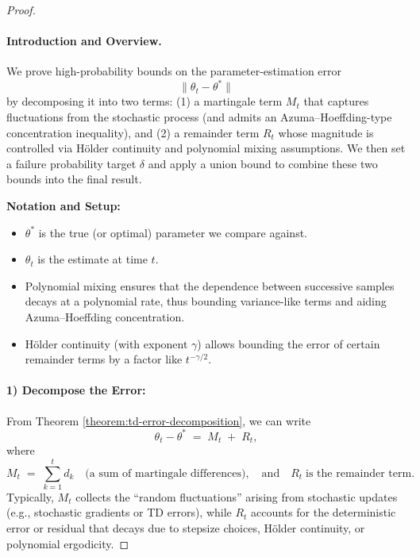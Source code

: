 \begin{proof}
\;\newline
\paragraph{Introduction and Overview.}
We prove high-probability bounds on the parameter-estimation error
\[
  \|\theta_t - \theta^*\|
\]
by decomposing it into two terms: (1) a martingale term $M_t$ that captures fluctuations from the stochastic process (and admits an Azuma--Hoeffding-type concentration inequality), and (2) a remainder term $R_t$ whose magnitude is controlled via H\"older continuity and polynomial mixing assumptions. We then set a failure probability target $\delta$ and apply a union bound to combine these two bounds into the final result.

\medskip
\noindent\newline
\textbf{Notation and Setup:}
\begin{itemize}
\item \(\theta^*\) is the true (or optimal) parameter we compare against.  
\item \(\theta_t\) is the estimate at time \(t\).  
\item Polynomial mixing ensures that the dependence between successive samples decays at a polynomial rate, thus bounding variance-like terms and aiding Azuma--Hoeffding concentration.  
\item H\"older continuity (with exponent \(\gamma\)) allows bounding the error of certain remainder terms by a factor like \(t^{-\gamma/2}\).  
\end{itemize}

\paragraph{1) Decompose the Error:}
From Theorem \ref{theorem:td-error-decomposition}, we can write
\[
  \theta_t - \theta^*
  \;=\;
  M_t \;+\; R_t,
\]
where
\[
  M_t
  \;=\;
  \sum_{k=1}^t d_k
  \quad
  \text{(a sum of martingale differences)}, 
  \quad
  \text{and}
  \quad
  R_t
  \;\text{is the remainder term.}
\]
Typically, $M_t$ collects the ``random fluctuations'' arising from stochastic updates (e.g., stochastic gradients or TD errors), while $R_t$ accounts for the deterministic error or residual that decays due to stepsize choices, H\"older continuity, or polynomial ergodicity.


\end{proof}
